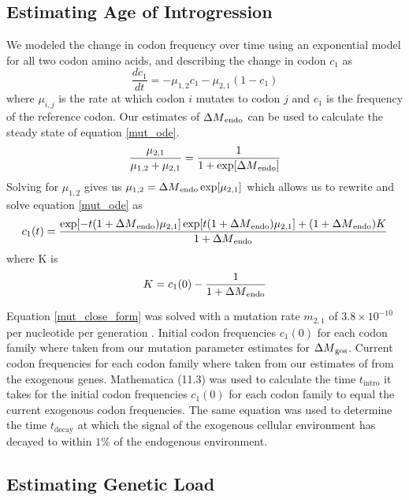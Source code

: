 \subsection{Estimating Age of Introgression}
We modeled the change in codon frequency over time using an exponential model for all two codon amino acids, and describing the change in codon $c_1$ as
\begin{equation}
\frac{d c_1}{d t} = -\mu_{1,2}c_1 - \mu_{2,1}(1-c_1)
\label{mut_ode}
\end{equation}
where $\mu_{i,j}$ is the rate at which codon $i$ mutates to codon $j$ and $c_1$ is the frequency of the reference codon.
Our estimates of ${\Delta M}_\text{endo}$ can be used to calculate the steady state of equation \ref{mut_ode}.
\begin{equation}
\frac{\mu_{2,1}}{\mu_{1,2} + \mu_{2,1}} = \frac{1}{1+\exp[{\Delta M}_\text{endo}]}
\end{equation}
Solving for $\mu_{1,2}$ gives us $\mu_{1,2} = {\Delta M}_\text{endo}\exp[\mu_{2,1}]$ which allows us to rewrite and solve equation \ref{mut_ode} as
\begin{equation}
c_1(t) = \frac{\exp[-t(1+{\Delta M}_\text{endo})\mu_{2,1}]\exp[t(1+{\Delta M}_\text{endo})\mu_{2,1}] + (1+{\Delta M}_\text{endo})K}{1+{\Delta M}_\text{endo}}
\label{mut_close_form}
\end{equation}
where K is
\begin{equation}
K = c_1(0) - \frac{1}{1+{\Delta M}_\text{endo}}
\end{equation}

Equation \ref{mut_close_form} was solved with a mutation rate $m_{2,1}$ of $3.8\times 10^{-10}$ per nucleotide per generation \citep{lang2008}. 
Initial codon frequencies $c_1(0)$ for each codon family where taken from our mutation parameter estimates for \gossypii ${\Delta M}_\text{gos}$. 
Current codon frequencies for each codon family where taken from our estimates of \DM from the exogenous genes.
Mathematica (11.3) \citep{Mathematica11} was used to calculate the time $t_\text{intro}$ it takes for the initial codon frequencies $c_1(0)$ for each codon family to equal the current exogenous codon frequencies.
The same equation was used to determine the time $t_\text{decay}$ at which the signal of the exogenous cellular environment has decayed to within $1 \%$ of the endogenous environment.

\subsection{Estimating Genetic Load}

